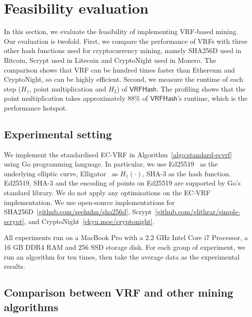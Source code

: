 \section{Feasibility evaluation}
\label{sec:feasibility}

In this section, we evaluate the feasibility of implementing VRF-based mining.
Our evaluation is twofold.
First, we compare the performance of VRFs with three other hash functions used for cryptocurrency mining, namely SHA256D used in Bitcoin, Scrypt used in Litecoin and CryptoNight used in Monero.
The comparison shows that VRF can be hundred times faster than Ethereum and CryptoNight, so can be highly efficient.
Second, we measure the runtime of each step ($H_1$, point multiplication and $H_2$) of $\mathsf{VRFHash}$.
The profiling shows that the point multiplication takes approximately 88\% of $\mathsf{VRFHash}$'s runtime, which is the performance hotspot.

\subsection{Experimental setting}

We implement the standardised EC-VRF in Algorithm~\ref{algo:standard-ecvrf} using Go programming language.
In particular, we use Ed25519~\cite{bernstein2012high} as the underlying elliptic curve, Elligator~\cite{bernstein2013elligator} as $H_1(\cdot)$, SHA-3 as the hash function.
Ed25519, SHA-3 and the encoding of points on Ed25519 are supported by Go's standard library.
We do not apply any optimisations on the EC-VRF implementation.
We use open-source implementations for SHA256D~\ref{github.com/seehuhn/sha256d}, Scrypt~\ref{github.com/elithrar/simple-scrypt}, and CryptoNight~\ref{ekyu.moe/cryptonight}.

All experiments run on a MacBook Pro with a 2.2 GHz Intel Core i7 Processor, a 16 GB DDR4 RAM and 256 SSD storage disk.
For each group of experiment, we run an algorithm for ten times, then take the average data as the experimental results.




\subsection{Comparison between VRF and other mining algorithms}

